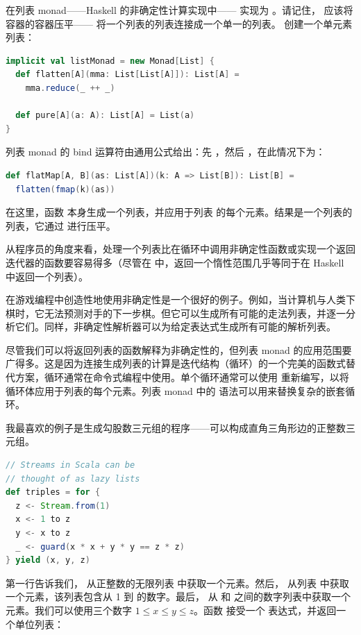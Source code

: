 在列表 monad——Haskell 的非确定性计算实现中—— 实现为 。请记住， 应该将容器的容器压平—— 将一个列表的列表连接成一个单一的列表。 创建一个单元素列表：

\begin{lstlisting}[language=Scala]
implicit val listMonad = new Monad[List] {
  def flatten[A](mma: List[List[A]]): List[A] =
    mma.reduce(_ ++ _)

  def pure[A](a: A): List[A] = List(a)
}
\end{lstlisting}
列表 monad 的 bind 运算符由通用公式给出：先 ，然后 ，在此情况下为：

\begin{lstlisting}[language=Scala]
def flatMap[A, B](as: List[A])(k: A => List[B]): List[B] =
  flatten(fmap(k)(as))
\end{lstlisting}
在这里，函数  本身生成一个列表，并应用于列表  的每个元素。结果是一个列表的列表，它通过  进行压平。

从程序员的角度来看，处理一个列表比在循环中调用非确定性函数或实现一个返回迭代器的函数要容易得多（尽管在  中，返回一个惰性范围几乎等同于在 Haskell 中返回一个列表）。

在游戏编程中创造性地使用非确定性是一个很好的例子。例如，当计算机与人类下棋时，它无法预测对手的下一步棋。但它可以生成所有可能的走法列表，并逐一分析它们。同样，非确定性解析器可以为给定表达式生成所有可能的解析列表。

尽管我们可以将返回列表的函数解释为非确定性的，但列表 monad 的应用范围要广得多。这是因为连接生成列表的计算是迭代结构（循环）的一个完美的函数式替代方案，循环通常在命令式编程中使用。单个循环通常可以使用  重新编写，以将循环体应用于列表的每个元素。列表 monad 中的  语法可以用来替换复杂的嵌套循环。

我最喜欢的例子是生成勾股数三元组的程序——可以构成直角三角形边的正整数三元组。

\begin{lstlisting}[language=Scala]
// Streams in Scala can be
// thought of as lazy lists
def triples = for {
  z <- Stream.from(1)
  x <- 1 to z
  y <- x to z
  _ <- guard(x * x + y * y == z * z)
} yield (x, y, z)
\end{lstlisting}
第一行告诉我们， 从正整数的无限列表 \code{{[}1..{]}} 中获取一个元素。然后， 从列表 \code{{[}1..z{]}} 中获取一个元素，该列表包含从 1 到  的数字。最后， 从  和  之间的数字列表中获取一个元素。我们可以使用三个数字 $1 \leqslant x \leqslant y \leqslant z$。函数  接受一个  表达式，并返回一个单位列表：

